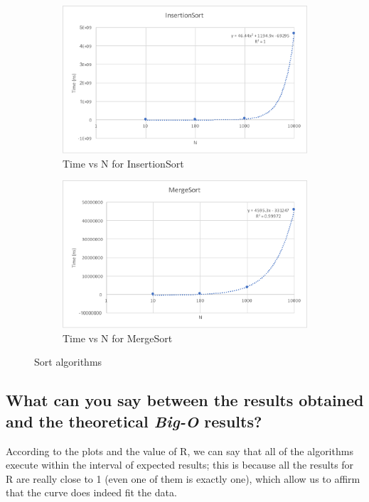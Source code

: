 \documentclass[a4paper,12pt]{article}
\begin{document}
    \begin{figure}[H]
        \begin{subfigure}[t]{0.495\textwidth}
            \centering
            \includegraphics[width=\textwidth]{InsertionSort.pdf}
            \caption{Time vs N for InsertionSort}
        \end{subfigure}
        \begin{subfigure}[t]{0.495\textwidth}
            \centering
            \includegraphics[width=\textwidth]{MergeSort.pdf}
            \caption{Time vs N for MergeSort}
        \end{subfigure}
        \caption{Sort algorithms}
    \end{figure}

    \subsection{What can you say between the results obtained and the theoretical \textit{Big-O} results?}
      According to the plots and the value of R, we can say that all of the algorithms execute within the interval of expected results;
      this is because all the results for R are really close to 1 (even one of them is exactly one), which allow us to affirm that the curve
      does indeed fit the data.
\end{document}
